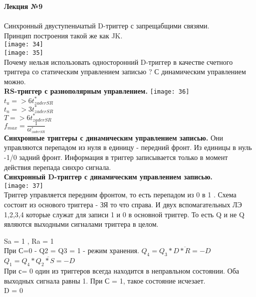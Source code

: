 

\LARGE{ \textbf {Лекция №9}}\\
\Large{ \textbf {}}\\

Синхронный двуступеньчатый D-триггер с запрещабщими связями.\\

Принцип построения такой же как JK.\\
\texttt{[image: 34]}\\
\texttt{[image: 35]}\\
Почему нельзя использовать односторонний D-триггер в качестве счетного триггера со статическим управлением записью ? С динамическим управлением можно.\\

\textbf{RS-триггер с разнополярным управлением.}
\texttt{[image: 36]}\\
$t_{u} => 6t^*_{zaderSR}$\\
$t_{n} => 3t^*_{zaderSR}$\\
$T => 6t^*_{zaderSR} $\\
$f_{max} = \frac{1}{ 6t^*_{zaderSR}} $\\



\textbf{Синхронные триггеры с динамическим управлением записью.}
Они управляются перепадом из нуля в единицу - передний фронт. Из единицы в нуль -1/0 задний фронт.
Информация в триггер записывается только в момент действия перепада синхро сигнала.\\

\textbf{Синхронный D-триггер с динамическим управлением записью.}\\
\texttt{[image: 37]}\\

Триггер управляется передним фронтом, то есть перепадом из 0 в 1 .
Схема состоит из основого триггера - ЗЯ то что справа.
И двух вспомагательных ЛЭ 1,2,3,4 которые служат для записи 1 и 0 в основной триггер.
То есть Q и не Q являются  выходными сигналами триггера в целом.

Sa = 1 , Ra = 1\\
При С=0 - Q2 = Q3 = 1 - режим хранения.
$Q_4 = \overline {Q_3 * D *R = -D }  $ \\
$Q_1 = \overline{ Q_4 * Q_2 *S = -D }  $ \\
При с= 0 один из триггеров всегда находится в неправльном состоянии. Оба выходных сигнала равны 1.
При С = 1, такое состояние исчезает.\\
D =  0


